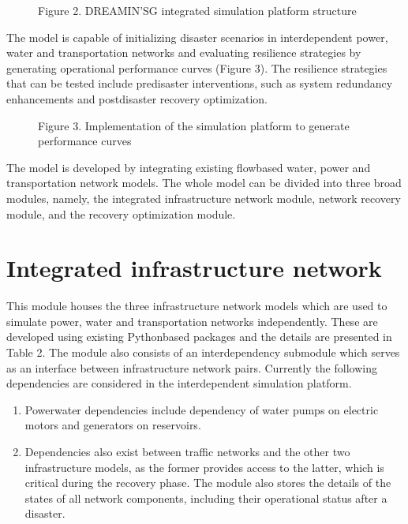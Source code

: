 \documentclass[letterpaper,10pt,english]{sphinxmanual}
\begin{document}
\begin{figure}[htbp]
\centering
\capstart

\noindent{}
\caption{Figure 2. DREAMIN’SG integrated simulation platform structure}\label{\detokenize{model:id1}}\end{figure}

\sphinxAtStartPar
The model is capable of initializing disaster scenarios in interdependent power, water and transportation
networks and evaluating resilience strategies by generating operational performance curves (Figure 3).
The resilience strategies that can be tested include pre\sphinxhyphen{}disaster interventions, such as system redundancy
enhancements and post\sphinxhyphen{}disaster recovery optimization.

\begin{figure}[htbp]
\centering
\capstart

\noindent{}
\caption{Figure 3. Implementation of the simulation platform to generate performance curves}\label{\detokenize{model:id2}}\end{figure}

\sphinxAtStartPar
The model is developed by integrating existing flow\sphinxhyphen{}based water, power and transportation network models.
The whole model can be divided into three broad modules, namely, the integrated infrastructure network module, network recovery module, and the
recovery optimization module.


\section{Integrated infrastructure network}
\label{\detokenize{model:integrated-infrastructure-network}}
\sphinxAtStartPar
This module houses the three infrastructure network models which are used to simulate power\sphinxhyphen{},
water\sphinxhyphen{} and transportation networks independently. These are developed using existing Python\sphinxhyphen{}based packages and the details are presented in
Table 2. The module also consists of an interdependency sub\sphinxhyphen{}module which serves as an interface between infrastructure network pairs.
Currently the following dependencies are considered in the interdependent simulation platform.
\begin{enumerate}
%
\item {} 
\sphinxAtStartPar
Power\sphinxhyphen{}water dependencies include dependency of water pumps on electric motors and generators on reservoirs.

\item {} 
\sphinxAtStartPar
Dependencies also exist between traffic networks and the other two infrastructure models, as the former provides access to the latter, which is critical during the recovery phase. The module also stores the details of the states of all network components, including their operational status after a disaster.

\end{enumerate}
\end{document}
